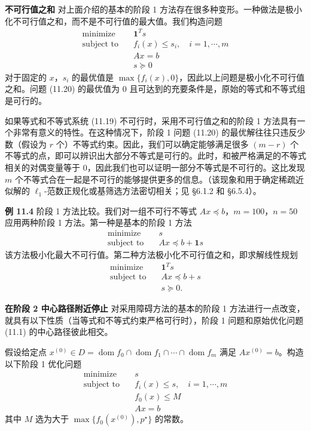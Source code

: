 \documentclass[UTF8, 12pt, fontset=fandol, oneside]{ctexart}
\begin{document}
\noindent\textbf{不可行值之和}\quad
对上面介绍的基本的阶段 1 方法存在很多种变形。一种做法是极小化不可行值之和，而不是不可行值的最大值。我们构造问题
\begin{equation}
\begin{aligned}
\text{minimize}\quad & \mathbf{1}^Ts\\
\text{subject to}\quad & f_i(x)\leq s_i,\quad i=1,\cdots,m\\
& Ax=b\\
& s\succeq 0
\end{aligned}
\tag{11.20}
\end{equation}
对于固定的 $x$，$s_i$ 的最优值是 $\max\{f_i(x),0\}$，因此以上问题是极小化不可行值之和。问题 (11.20) 的最优值为 0 且可达到的充要条件是，原始的等式和不等式组是可行的。

如果等式和不等式系统 (11.19) 不可行时，采用不可行值之和的阶段 1 方法具有一个非常有意义的特性。在这种情况下，阶段 1 问题 (11.20) 的最优解往往只违反少数（假设为 $r$ 个）不等式约束。因此，我们可以确定能够满足很多 $(m-r)$ 个不等式的点，即可以辨识出大部分不等式是可行的。此时，和被严格满足的不等式相关的对偶变量等于 0，因此我们也可以证明一部分不等式是不可行的。这比发现 $m$ 个不等式合在一起是不可行的能够提供更多的信息。（该现象和用于确定稀疏近似解的 $\ell_1$-范数正规化或基筛选方法密切相关；见 \S6.1.2 和 \S6.5.4）。

\noindent\textbf{例 11.4}\quad
阶段 1 方法比较。我们对一组不可行不等式 $Ax\preceq b$，$m=100$，$n=50$ 应用两种阶段 1 方法。第一种是基本的阶段 1 方法
\[
\begin{aligned}
\text{minimize}\quad & s\\
\text{subject to}\quad & Ax\preceq b+\mathbf{1}s
\end{aligned}
\]
该方法极小化最大不可行值。第二种方法极小化不可行值之和，即求解线性规划
\[
\begin{aligned}
\text{minimize}\quad & \mathbf{1}^Ts\\
\text{subject to}\quad & Ax\preceq b+s\\
& s\succeq 0.
\end{aligned}
\]

\noindent\textbf{在阶段 2 中心路径附近停止}\quad
对采用障碍方法的基本的阶段 1 方法进行一点改变，就具有以下性质（当等式和不等式约束严格可行时），阶段 1 问题和原始优化问题 (11.1) 的中心路径彼此相交。

假设给定点 $x^{(0)}\in D=\operatorname{dom} f_0\cap\operatorname{dom} f_1\cap\cdots\cap\operatorname{dom} f_m$ 满足 $Ax^{(0)}=b$。构造以下阶段 1 优化问题
\begin{equation}
\begin{aligned}
\text{minimize}\quad & s\\
\text{subject to}\quad & f_i(x)\leq s,\quad i=1,\cdots,m\\
& f_0(x)\leq M\\
& Ax=b
\end{aligned}
\tag{11.21}
\end{equation}
其中 $M$ 选为大于 $\max\{f_0(x^{(0)}),p^\star\}$ 的常数。
\end{document}
